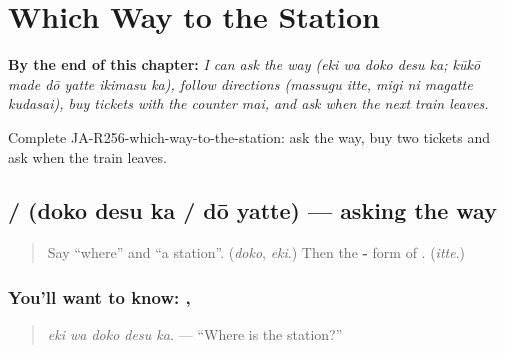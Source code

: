 
\chapter{Which Way to the Station}
\label{ch:ja-which-way-to-the-station}

\begin{chapteropening}
\textbf{By the end of this chapter:} \emph{I can ask the way (eki wa doko desu ka; kūkō made dō yatte ikimasu ka), follow directions (massugu itte, migi ni magatte kudasai), buy tickets with the counter mai, and ask when the next train leaves.}

Complete JA-R256-which-way-to-the-station: ask the way, buy two tickets and ask when the train leaves.
\end{chapteropening}

\section[\texorpdfstring{\ja{どこですか} … (doko desu ka …)}{どこですか … (doko desu ka …)}]{ /  (doko desu ka / dō yatte) — asking the way}

\label{lesson:JA-C256-dou-yatte}



\begin{quote}
Say \textquotedblleft{}where\textquotedblright{} and \textquotedblleft{}a station\textquotedblright{}. (\emph{doko}, \emph{eki}.) Then the \textbf{-} form of \textbf{}. (\emph{itte}.)
\end{quote}

\subsection*{You'll want to know: , }
\begin{quote}
\textbf{ }
\end{quote}

\begin{quote}
\emph{eki wa doko desu ka.} — \textquotedblleft{}Where is the station?\textquotedblright{}
\end{quote}

